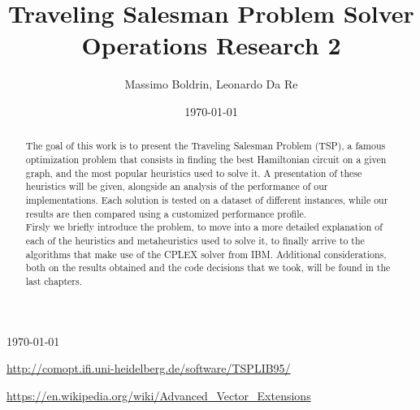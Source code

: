 \documentclass[a4paper]{report}
\begin{document}
\begin{titlepage}
	
	\vfill\vfill\vfill %
	
	{\large\today} %
	
	
	 
	
	\vfill %
	
\end{titlepage}


\title{Traveling Salesman Problem Solver \\ Operations Research 2} %

\author{Massimo Boldrin, Leonardo Da Re}

\date{\today}

\begin{abstract}
	The goal of this work is to present the Traveling Salesman Problem (TSP), a famous optimization
	problem that consists in finding the best Hamiltonian circuit on a given graph, and
	the most popular heuristics used to solve it. A presentation of these heuristics will be given, alongside an analysis of
	the performance of our implementations. Each solution is tested on a dataset of different instances, while our results are then
	compared using a customized performance profile.\\
	Firsly we briefly introduce the problem, to move into a more detailed explanation of each of the heuristics and metaheuristics used
	to solve it, to finally arrive to the algorithms that make use of the CPLEX solver from IBM.
	Additional considerations, both on the results obtained and the code decisions that we took, will be found in the last chapters.
\end{abstract}

\tableofcontents



















\begin{thebibliography}{9}
	\url{http://comopt.ifi.uni-heidelberg.de/software/TSPLIB95/}

	\url{https://en.wikipedia.org/wiki/Advanced_Vector_Extensions}

\end{thebibliography}
\end{document}

